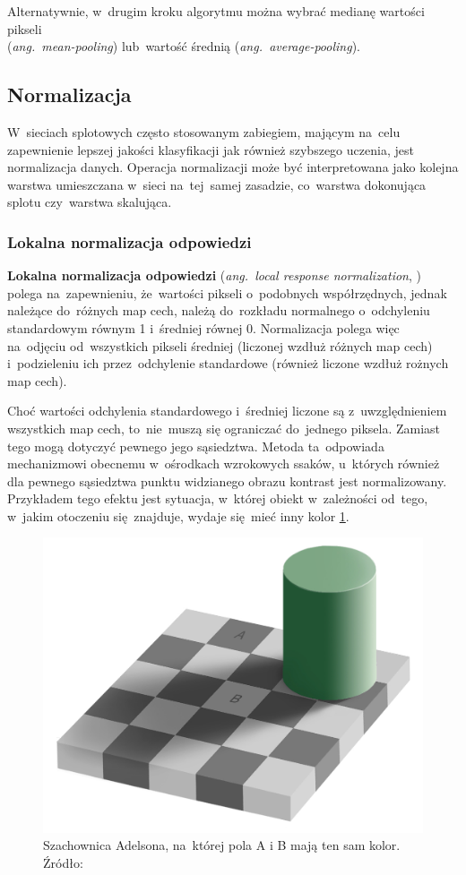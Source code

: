 Alternatywnie, w~drugim kroku algorytmu można wybrać medianę wartości pikseli\\
(\textit{ang.~mean-pooling}) lub~wartość średnią (\textit{ang.~average-pooling}).

\subsection{Normalizacja}
W~sieciach splotowych często stosowanym zabiegiem, mającym na~celu zapewnienie lepszej jakości klasyfikacji jak również
szybszego uczenia, jest normalizacja danych. Operacja normalizacji może być interpretowana jako kolejna warstwa
umieszczana w~sieci na~tej~samej zasadzie, co~warstwa dokonująca splotu czy~warstwa skalująca.

\subsubsection{Lokalna normalizacja odpowiedzi} \label{sssec:normalizacja_odpowiedzi}
\textbf{Lokalna normalizacja odpowiedzi} (\textit{ang.~local response normalization}, \cite{HOG}) polega na~zapewnieniu,
że~wartości pikseli o~podobnych współrzędnych, jednak należące do~różnych map cech, należą do~rozkładu normalnego
o~odchyleniu standardowym równym 1 i~średniej równej 0. Normalizacja polega więc na~odjęciu od~wszystkich pikseli
średniej (liczonej wzdłuż różnych map cech) i~podzieleniu ich przez~odchylenie standardowe (również liczone wzdłuż
rożnych map cech).

Choć wartości odchylenia standardowego i~średniej liczone są z~uwzględnieniem wszystkich map cech, to~nie~muszą
się ograniczać do~jednego piksela. Zamiast tego mogą dotyczyć pewnego jego sąsiedztwa. Metoda ta~odpowiada
mechanizmowi obecnemu w~ośrodkach wzrokowych ssaków, u~których również dla pewnego sąsiedztwa punktu widzianego
obrazu kontrast jest normalizowany. Przykładem tego efektu jest sytuacja, w~której obiekt w~zależności od~tego,
w~jakim otoczeniu się~znajduje, wydaje się~mieć inny kolor \ref{img:chess-illusion}.

\begin{figure}[H]
	\centering
	\includegraphics[width=0.8\linewidth]{img/chess-illusion.png}
	\caption{Szachownica Adelsona, na~której pola A i B mają ten sam kolor. Źródło: \cite{adelson-checker-illusion}}
	\label{img:chess-illusion}
\end{figure}

